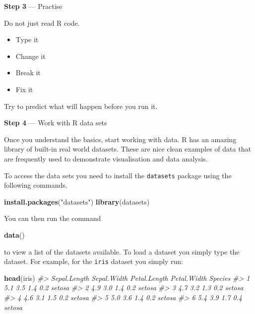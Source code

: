 \documentclass[
]{book}
\newenvironment{Shaded}{\begin{snugshade}}{\end{snugshade}}
\newcommand{\CommentTok}[1]{\textcolor[rgb]{0.56,0.35,0.01}{\textit{#1}}}
\newcommand{\FunctionTok}[1]{\textcolor[rgb]{0.13,0.29,0.53}{\textbf{#1}}}
\newcommand{\NormalTok}[1]{#1}
\newcommand{\StringTok}[1]{\textcolor[rgb]{0.31,0.60,0.02}{#1}}
\providecommand{\tightlist}{%
  \setlength{\itemsep}{0pt}\setlength{\parskip}{0pt}}
\begin{document}
\textbf{Step 3} --- Practise

Do not just read R code.

\begin{itemize}
\tightlist
\item
  Type it
\item
  Change it
\item
  Break it
\item
  Fix it
\end{itemize}

Try to predict what will happen before you run it.

\textbf{Step 4} --- Work with R data sets

Once you understand the basics, start working with data. R has an amazing library of built-in real world datasets. These are nice clean examples of data that are frequently used to demonstrate visualisation and data analysis.

To access the data sets you need to install the \texttt{datasets} package using the following commands.

\begin{Shaded}
\begin{Highlighting}[]
\FunctionTok{install.packages}\NormalTok{(}\StringTok{"datasets"}\NormalTok{)}
\FunctionTok{library}\NormalTok{(datasets)}
\end{Highlighting}
\end{Shaded}

You can then run the command

\begin{Shaded}
\begin{Highlighting}[]
\FunctionTok{data}\NormalTok{()}
\end{Highlighting}
\end{Shaded}

to view a list of the datasets available. To load a dataset you simply type the dataset. For example, for the \texttt{iris} dataset you simply run:

\begin{Shaded}
\begin{Highlighting}[]
\FunctionTok{head}\NormalTok{(iris)}
\CommentTok{\#\textgreater{}   Sepal.Length Sepal.Width Petal.Length Petal.Width Species}
\CommentTok{\#\textgreater{} 1          5.1         3.5          1.4         0.2  setosa}
\CommentTok{\#\textgreater{} 2          4.9         3.0          1.4         0.2  setosa}
\CommentTok{\#\textgreater{} 3          4.7         3.2          1.3         0.2  setosa}
\CommentTok{\#\textgreater{} 4          4.6         3.1          1.5         0.2  setosa}
\CommentTok{\#\textgreater{} 5          5.0         3.6          1.4         0.2  setosa}
\CommentTok{\#\textgreater{} 6          5.4         3.9          1.7         0.4  setosa}
\end{Highlighting}
\end{Shaded}
\end{document}
